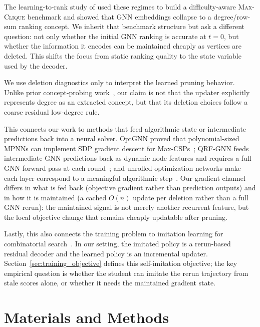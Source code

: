 \documentclass[mathematics,article,submit,pdftex,moreauthors]{Definitions/mdpi}
\begin{document}
The learning-to-rank study of \citet{ShohamHRV26} used these regimes to build a
difficulty-aware \textsc{Max-Clique} benchmark and showed that GNN embeddings
collapse to a degree/row-sum ranking concept. We inherit that benchmark structure
but ask a different question: not only whether the initial GNN ranking is accurate
at $t=0$, but whether the information it encodes can be maintained cheaply as
vertices are deleted. This shifts the focus from static ranking quality to the
state variable used by the decoder.

We use deletion diagnostics only to interpret the learned pruning behavior. Unlike
prior concept-probing work~\citep{ShohamHRV26,shoham2026sat,kim2018,schut2023bridging},
our claim is not that the updater explicitly represents degree as an extracted
concept, but that its deletion choices follow a coarse residual low-degree rule.

This connects our work to methods that feed algorithmic state or intermediate
predictions back into a neural solver. OptGNN proved that polynomial-sized MPNNs can
implement SDP gradient descent for Max-CSPs~\citep{yau2023}; QRF-GNN feeds
intermediate GNN predictions back as dynamic node features and requires a full GNN
forward pass at each round~\citep{gaile2024}; and unrolled optimization networks
make each layer correspond to a meaningful algorithmic step~\citep{monga2021,hadou2025}.
Our gradient channel differs in what is fed back (objective gradient
rather than prediction outputs) and in how it is maintained (a cached $O(n)$
update per deletion rather than a full GNN rerun): the maintained signal is not
merely another recurrent feature, but the local objective change that remains cheaply
updatable after pruning.

Lastly, this also connects the training problem to imitation learning for combinatorial
search~\citep{liu2021}. In our setting, the imitated policy is a rerun-based
residual decoder and the learned policy is an incremental updater. Section~\ref{sec:training_objective}
defines this self-imitation objective; the key empirical question is whether the
student can imitate the rerun trajectory from stale scores alone, or whether it
needs the maintained gradient state.

\section{Materials and Methods}
\label{sec:method}
\end{document}
